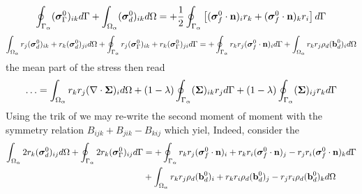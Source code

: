 \begin{multline}
    \oint_{\Gamma_{\alpha}}  (\bm{\sigma}_\Gamma^0)_{ik} d\Gamma
    +\int_{\Omega_{\alpha}}  (\bm{\sigma}_d^0)_{ik} d\Omega
    = 
    +
    \frac{1}{2}\oint_{\Gamma_{\alpha}}  \left[
        (\bm{\sigma}_f^0 \cdot \textbf{n})_i r_k
        + (\bm{\sigma}_f^0 \cdot \textbf{n})_k r_i
    \right]
     d\Gamma
\end{multline}
\begin{multline}
    \int_{\Omega_{\alpha}}  r_{j}(\bm{\sigma}^0_d)_{ik}+r_{k}(\bm{\sigma}^0_d)_{ji} d\Omega
    +\oint_{\Gamma_{\alpha}}  r_{j}(\bm{\sigma}^0_\Gamma)_{ik}+r_{k}(\bm{\sigma}_\Gamma^0)_{ji} d\Gamma
    = 
    +\oint_{\Gamma_{\alpha}}   r_{k}r_{j} (\bm{\sigma}_f^0\cdot\textbf{n})_i  d\Gamma
    + \int_{\Omega_{\alpha}}  r_{k}r_{j}  \rho_d (\textbf{b}_d^0)_i  d\Omega 
\end{multline}
the mean part of the stress then read
\begin{equation}
    \ldots=\int_{\Omega_{\alpha}}   r_{k}r_{j} (\mathbf{\nabla}\cdot \bm{\Sigma})_i  d\Omega
    +(1-\lambda)\oint_{\Gamma_{\alpha}}   (\bm{\Sigma})_{ik} r_{j}   d\Gamma
    +(1-\lambda)\oint_{\Gamma_{\alpha}}   (\bm{\Sigma})_{ij} r_{k}   d\Gamma
\end{equation}
Using the trik of \citet{lhuillier1996contribution} we may re-write the second moment of moment with the symmetry relation  $B_{ijk} + B_{jik} - B_{kij}$  which yiel, 
Indeed, consider the 
\begin{align}
    \int_{\Omega_{\alpha}} 2 r_{k}(\bm{\sigma}^0_d)_{ij} d\Omega
    +\oint_{\Gamma_{\alpha}} 2r_{k}(\bm{\sigma}^0_\Gamma)_{ij} d\Gamma
    &= 
    +\oint_{\Gamma_{\alpha}} 
        r_{k}r_{j} (\bm{\sigma}_f^0\cdot\textbf{n})_i 
        + r_{k}r_{i} (\bm{\sigma}_f^0\cdot\textbf{n})_j 
        - r_{j}r_{i} (\bm{\sigma}_f^0\cdot\textbf{n})_k 
     d\Gamma\\
    &
    + \int_{\Omega_{\alpha}}  
        r_{k}r_{j}  \rho_d (\textbf{b}_d^0)_i 
        +r_{k}r_{i}  \rho_d (\textbf{b}_d^0)_j 
        -r_{j}r_{i}  \rho_d (\textbf{b}_d^0)_k 
         d\Omega
\end{align}


